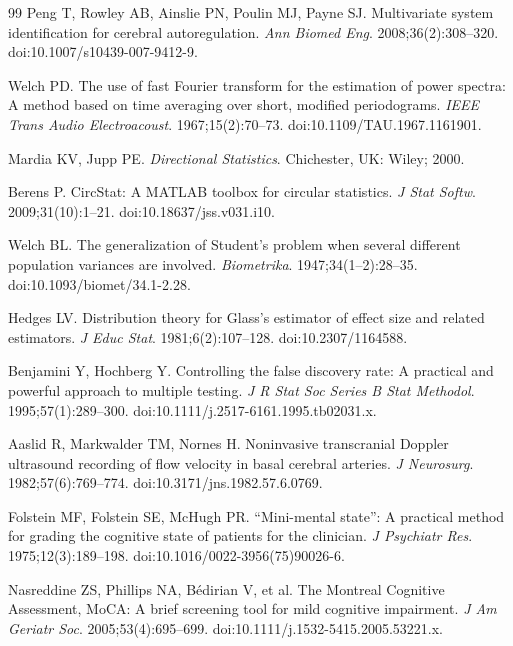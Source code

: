 \documentclass[12pt]{article}
\begin{document}
\begin{thebibliography}{99}
Peng T, Rowley AB, Ainslie PN, Poulin MJ, Payne SJ.
Multivariate system identification for cerebral autoregulation.
\textit{Ann Biomed Eng}. 2008;36(2):308--320.
doi:10.1007/s10439-007-9412-9.

Welch PD.
The use of fast Fourier transform for the estimation of power spectra: A
method based on time averaging over short, modified periodograms.
\textit{IEEE Trans Audio Electroacoust}. 1967;15(2):70--73.
doi:10.1109/TAU.1967.1161901.

Mardia KV, Jupp PE.
\textit{Directional Statistics}.
Chichester, UK: Wiley; 2000.

Berens P.
CircStat: A MATLAB toolbox for circular statistics.
\textit{J Stat Softw}. 2009;31(10):1--21.
doi:10.18637/jss.v031.i10.

Welch BL.
The generalization of Student's problem when several different population
variances are involved.
\textit{Biometrika}. 1947;34(1--2):28--35.
doi:10.1093/biomet/34.1-2.28.

Hedges LV.
Distribution theory for Glass's estimator of effect size and related
estimators.
\textit{J Educ Stat}. 1981;6(2):107--128.
doi:10.2307/1164588.

Benjamini Y, Hochberg Y.
Controlling the false discovery rate: A practical and powerful approach to
multiple testing.
\textit{J R Stat Soc Series B Stat Methodol}. 1995;57(1):289--300.
doi:10.1111/j.2517-6161.1995.tb02031.x.

Aaslid R, Markwalder TM, Nornes H.
Noninvasive transcranial Doppler ultrasound recording of flow velocity in
basal cerebral arteries.
\textit{J Neurosurg}. 1982;57(6):769--774.
doi:10.3171/jns.1982.57.6.0769.

Folstein MF, Folstein SE, McHugh PR.
``Mini-mental state'': A practical method for grading the cognitive state of
patients for the clinician.
\textit{J Psychiatr Res}. 1975;12(3):189--198.
doi:10.1016/0022-3956(75)90026-6.

Nasreddine ZS, Phillips NA, B\'edirian V, et al.
The Montreal Cognitive Assessment, MoCA: A brief screening tool for mild
cognitive impairment.
\textit{J Am Geriatr Soc}. 2005;53(4):695--699.
doi:10.1111/j.1532-5415.2005.53221.x.

\end{thebibliography}
\end{document}
